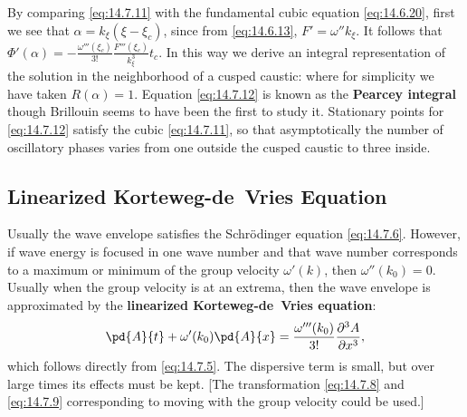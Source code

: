 By comparing \eqref{eq:14.7.11} with the fundamental cubic equation \eqref{eq:14.6.20}, first we see that $\alpha = k_\xi(\xi - \xi_c)$, since from \eqref{eq:14.6.13}, $F' = \omega''k_\xi$.  It follows that $\Phi'(\alpha) = -\frac{\omega'''(\xi_c)}{3!}\frac{F'''(\xi_c)}{k_\xi^3}t_c$.  In this way we derive an integral representation of the solution in the neighborhood of a cusped caustic:
where for simplicity we have taken $R(\alpha) = 1$.  Equation \eqref{eq:14.7.12} is known as the \textbf{Pearcey integral} though Brillouin seems to have been the first to study it.  Stationary points for \eqref{eq:14.7.12} satisfy the cubic \eqref{eq:14.7.11}, so that asymptotically the number of oscillatory phases varies from one outside the cusped caustic to three inside.

\subsection{Linearized Korteweg-de~Vries Equation}
\label{sec:linearized-kdv}

Usually the wave envelope satisfies the Schr\"odinger equation \eqref{eq:14.7.6}.  However, if wave energy is focused in one wave number and that wave number corresponds to a maximum or minimum of the group velocity $\omega'(k)$, then $\omega''(k_0) = 0$.  Usually when the group velocity is at an extrema, then the wave envelope is approximated by the \textbf{linearized Korteweg-de~Vries equation}:
\begin{equation}
\label{eq:14.7.13}
\pd{A}{t} + \omega'(k_0)\pd{A}{x} = \frac{\omega'''(k_0)}{3!}\frac{\partial^3 A}{\partial x^3},
\end{equation}
which follows directly from \eqref{eq:14.7.5}.  The dispersive term is small, but over large times its effects must be kept.  [The transformation \eqref{eq:14.7.8} and \eqref{eq:14.7.9} corresponding to moving with the group velocity could be used.]

